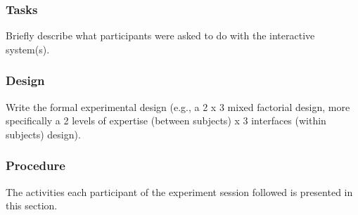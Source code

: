 \subsubsection{Tasks}
Briefly describe what participants were asked to do with the interactive system(s).

\subsubsection{Design}
Write the formal experimental design (e.g., a 2 x 3 mixed factorial design, more specifically a 2 levels of expertise (between subjects) x 3 interfaces (within subjects) design).
\subsubsection{Procedure}
The activities each participant of the experiment session followed is presented in this section.\\ 

